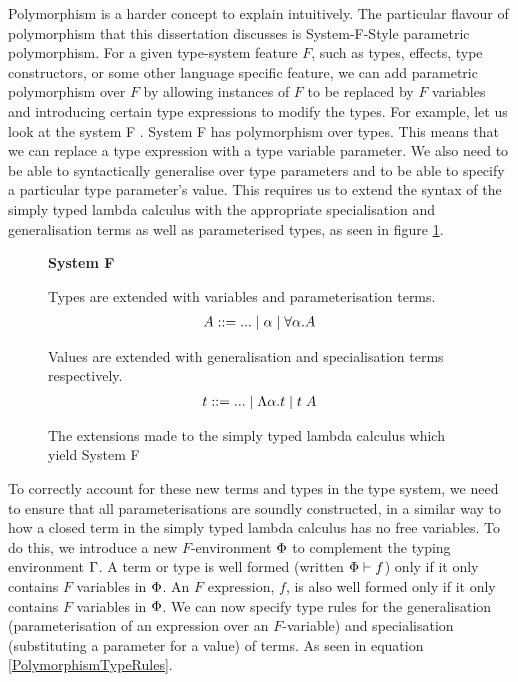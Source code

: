 \documentclass{Report}
\begin{document}
Polymorphism is a harder concept to explain intuitively. The particular flavour of polymorphism that this dissertation discusses is System-F-Style parametric polymorphism. For a given type-system feature $F$, such as types, effects, type constructors, or some other language specific feature, we can add parametric polymorphism over $F$ by allowing instances of $F$ to be replaced by $F$ variables and introducing certain type expressions to modify the types. For example, let us look at the system F . System F has polymorphism over types. This means that we can replace a type expression with a type variable parameter. We also need to be able to syntactically generalise over type parameters and to be able to specify a particular type parameter's value. This requires us to extend the syntax of the simply typed lambda calculus with the appropriate specialisation and generalisation terms as well as parameterised types, as seen in figure \ref{SystemFTermsTypes}.

\begin{figure}
    \begin{framed}
        \centering
        \textbf{System F}

        Types are extended with variables and parameterisation terms.
        \begin{align}
            A \gens ... \mid \a\mid \all{\a}{A}
        \end{align}

        Values are extended with generalisation and specialisation terms respectively.
        \begin{align}
            t \gens ... \mid \elam{\a}{t}\mid \eapp{t}{A}
        \end{align}
    \end{framed}
    \caption{The extensions made to the simply typed lambda calculus which yield System F}
    \label{SystemFTermsTypes}
\end{figure}

To correctly account for these new terms and types in the type system, we need to ensure that all parameterisations are soundly constructed, in a similar way to how a closed term in the simply typed lambda calculus has no free variables. To do this, we introduce a new $F$-environment $\P$ to complement the typing environment $\G$. A term or type is well formed (written $\wellformed{\P}{f}$) only if it only contains $F$ variables in $\P$. An $F$ expression, $f$, is also well formed only if it only contains $F$ variables in $\P$. We can now specify type rules for the generalisation (parameterisation of an expression over an $F$-variable) and specialisation (substituting a parameter for a value) of terms. As seen in equation \ref{PolymorphismTypeRules}.
\end{document}
